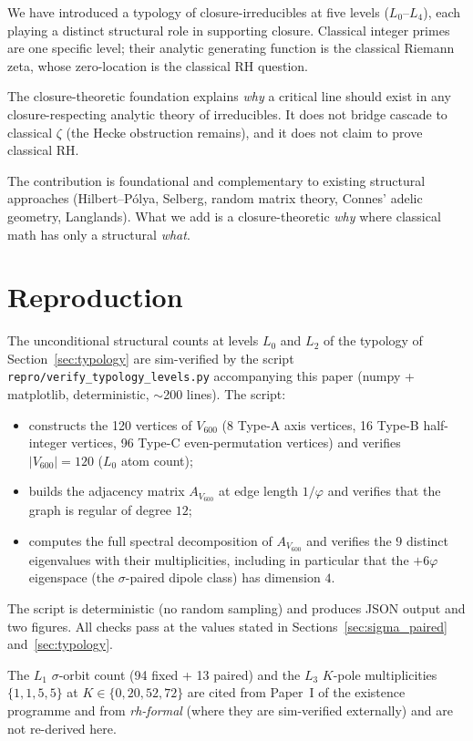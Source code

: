 \documentclass[11pt,a4paper]{article}
\theoremstyle{definition}
\theoremstyle{remark}
\begin{document}
We have introduced a typology of closure-irreducibles at five levels
($L_0$--$L_4$), each playing a distinct structural role in supporting
closure. Classical integer primes are one specific level; their
analytic generating function is the classical Riemann zeta, whose
zero-location is the classical RH question.

The closure-theoretic foundation explains \emph{why} a critical line
should exist in any closure-respecting analytic theory of irreducibles.
It does not bridge cascade to classical $\zeta$ (the Hecke obstruction
remains), and it does not claim to prove classical RH.

The contribution is foundational and complementary to existing
structural approaches (Hilbert--P\'olya, Selberg, random matrix theory,
Connes' adelic geometry, Langlands). What we add is a closure-theoretic
\emph{why} where classical math has only a structural \emph{what}.

\section{Reproduction}\label{sec:reproduction}

The unconditional structural counts at levels $L_0$ and $L_2$ of the
typology of Section~\ref{sec:typology} are sim-verified by the script
\texttt{repro/verify\_typology\_levels.py} accompanying this paper
(numpy + matplotlib, deterministic, $\sim$200 lines). The script:
\begin{itemize}
\item constructs the 120 vertices of $V_{600}$ (8 Type-A axis vertices,
      16 Type-B half-integer vertices, 96 Type-C even-permutation
      vertices) and verifies $|V_{600}| = 120$ ($L_0$ atom count);
\item builds the adjacency matrix $A_{V_{600}}$ at edge length $1/\varphi$
      and verifies that the graph is regular of degree $12$;
\item computes the full spectral decomposition of $A_{V_{600}}$ and
      verifies the $9$ distinct eigenvalues with their multiplicities,
      including in particular that the $+6\varphi$ eigenspace
      (the $\sigma$-paired dipole class) has dimension $4$.
\end{itemize}

The script is deterministic (no random sampling) and produces JSON
output and two figures. All checks pass at the values stated in
Sections~\ref{sec:sigma_paired} and~\ref{sec:typology}.

The $L_1$ $\sigma$-orbit count (94 fixed + 13 paired) and the $L_3$
$K$-pole multiplicities $\{1,1,5,5\}$ at $K \in \{0,20,52,72\}$ are
cited from Paper~I of the existence programme \cite{SmartExistenceClosure}
and from \emph{rh-formal} \cite{rhFormalSmart} (where they are
sim-verified externally) and are not re-derived here.
\end{document}
